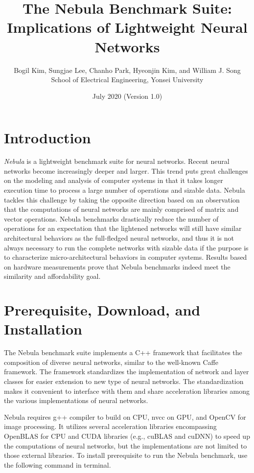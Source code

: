 \documentclass[10pt]{article}
\begin{document}
\title{The Nebula Benchmark Suite: Implications of Lightweight Neural Networks}
\author{Bogil Kim, Sungjae Lee, Chanho Park, Hyeonjin Kim, and William J. Song\\
        School of Electrical Engineering, Yonsei University\\}
\date{July 2020 (Version 1.0)}
\maketitle

\section{Introduction} \label{sec:introduction}
\emph{Nebula} is a lightweight benchmark suite for neural networks. 
Recent neural networks become increasingly deeper and larger. 
This trend puts great challenges on the modeling and analysis of computer systems in that it takes longer execution time to process a large number of operations and sizable data. 
Nebula tackles this challenge by taking the opposite direction based on an observation that the computations of neural networks are mainly comprised of matrix and vector operations. 
Nebula benchmarks drastically reduce the number of operations for an expectation that the lightened networks will still have similar architectural behaviors as the full-fledged neural networks, and thus it is not always necessary to run the complete networks with sizable data if the purpose is to characterize micro-architectural behaviors in computer systems. 
Results based on hardware measurements prove that Nebula benchmarks indeed meet the similarity and affordability goal.

\section{Prerequisite, Download, and Installation} \label{sec:install}
The Nebula benchmark suite implements a C++ framework that facilitates the composition of diverse neural networks, similar to the well-known Caffe framework.
The framework standardizes the implementation of network and layer classes for easier extension to new type of neural networks.
The standardization makes it convenient to interface with them and share acceleration libraries among the various implementations of neural networks.

Nebula requires g++ compiler to build on CPU, nvcc on GPU, and OpenCV for image processing.
It utilizes several acceleration libraries encompassing OpenBLAS for CPU and CUDA libraries (e.g., cuBLAS and cuDNN) to speed up the computations of neural networks, but the implementations are not limited to those external libraries.
To install prerequisite to run the Nebula benchmark, use the following command in terminal.
\end{document}

